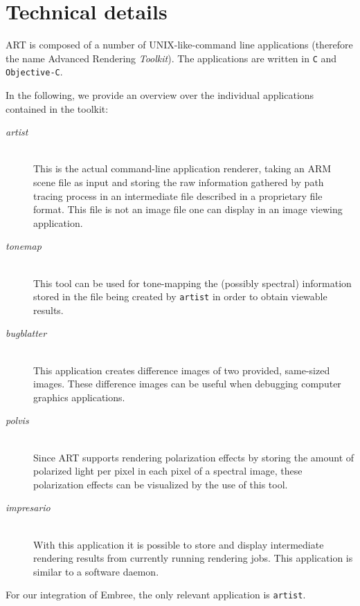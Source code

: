 \section{Technical details}
ART	is composed of a number of UNIX-like-command line applications (therefore the name Advanced Rendering \emph{Toolkit}). The applications are written in \texttt{C} and \texttt{Objective-C}. 

In the following, we provide an overview over the individual applications contained in the toolkit:
\begin{description}
	\item[\emph{artist}] \hfil \\ This is the actual command-line application renderer, taking an ARM scene file as input and storing the raw information gathered by path tracing process in an intermediate file described in a proprietary file format. This file is not an image file one can display in an image viewing application.
	\item[\emph{tonemap}] \hfil \\ This tool can be used for tone-mapping the (possibly spectral) information stored in the file being created by \texttt{artist} in order to obtain viewable results.
	\item[\emph{bugblatter}] \hfil \\ This application creates difference images of two provided, same-sized images. These difference images can be useful when debugging computer graphics applications.
	\item[\emph{polvis}] \hfil \\ Since ART supports rendering polarization effects by storing the amount of polarized light per pixel in each pixel of a spectral image, these polarization effects can be visualized by the use of this tool.
	\item[\emph{impresario}] \hfil \\ With this application it is possible to store and display intermediate rendering results from currently running rendering jobs. This application is similar to a software daemon.
\end{description}

For our integration of Embree, the only relevant application is \texttt{artist}. 


